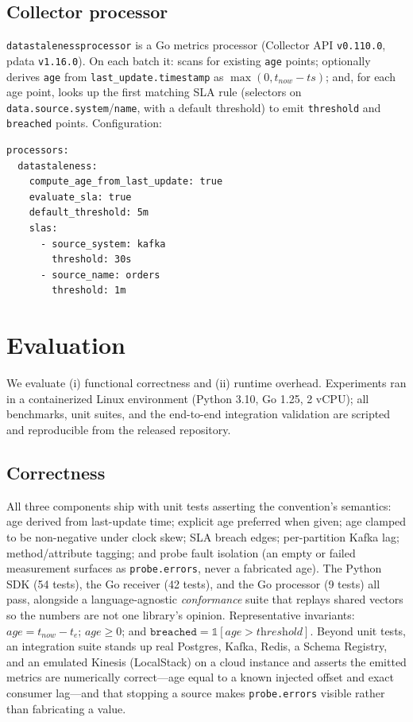 \documentclass[11pt]{article}
\begin{document}
\subsection{Collector processor}
\texttt{datastalenessprocessor} is a Go metrics processor (Collector API
\texttt{v0.110.0}, pdata \texttt{v1.16.0}). On each batch it: scans for existing
\texttt{age} points; optionally derives \texttt{age} from
\texttt{last\_update.timestamp} as \(\max(0, t_{now}-ts)\); and, for each age
point, looks up the first matching SLA rule (selectors on
\texttt{data.source.system}/\texttt{name}, with a default threshold) to emit
\texttt{threshold} and \texttt{breached} points. Configuration:

\begin{lstlisting}
processors:
  datastaleness:
    compute_age_from_last_update: true
    evaluate_sla: true
    default_threshold: 5m
    slas:
      - source_system: kafka
        threshold: 30s
      - source_name: orders
        threshold: 1m
\end{lstlisting}

\section{Evaluation}
\label{sec:eval}
We evaluate (i) functional correctness and (ii) runtime overhead. Experiments
ran in a containerized Linux environment (Python 3.10, Go 1.25, 2 vCPU); all
benchmarks, unit suites, and the end-to-end integration validation are scripted
and reproducible from the released repository.

\subsection{Correctness}
All three components ship with unit tests asserting the convention's semantics:
age derived from last-update time; explicit age preferred when given; age
clamped to be non-negative under clock skew; SLA breach edges; per-partition
Kafka lag; method/attribute tagging; and probe fault isolation (an empty or
failed measurement surfaces as \texttt{probe.errors}, never a fabricated age).
The Python SDK (54 tests), the Go receiver (42 tests), and the Go processor
(9 tests) all pass, alongside a language-agnostic \emph{conformance} suite that
replays shared vectors so the numbers are not one library's opinion.
Representative invariants: \(age = t_{now}-t_e\); \(age \geq 0\); and
\(\texttt{breached}=\mathbb{1}[age > \textit{threshold}]\). Beyond unit tests, an
integration suite stands up real Postgres, Kafka, Redis, a Schema Registry, and
an emulated Kinesis (LocalStack) on a cloud instance and asserts the emitted
metrics are numerically correct---age equal to a known injected offset and exact
consumer lag---and that stopping a source makes \texttt{probe.errors} visible
rather than fabricating a value.
\end{document}
